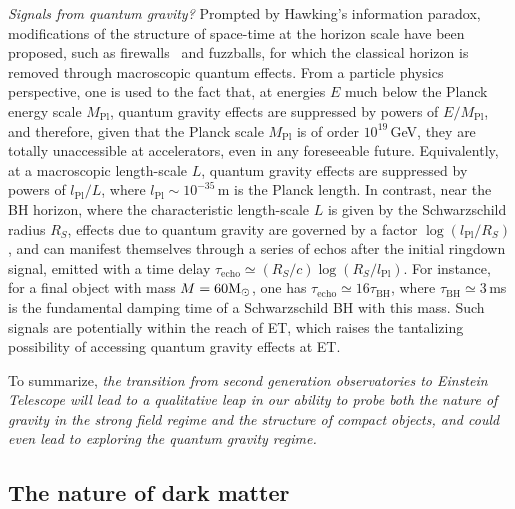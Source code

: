 \emph{Signals from quantum gravity?}
Prompted by Hawking's 
information paradox, modifications of the structure of space-time at the horizon scale have been proposed, such as firewalls~\cite{Almheiri:2012rt} and fuzzballs,
for which the classical horizon is removed through macroscopic quantum effects. 
From a particle physics perspective, one is used to the fact that, at energies $E$ much below the Planck energy scale $M_{\mathrm{Pl}}$, quantum gravity effects are suppressed by powers of 
$E/M_{\mathrm{Pl}}$, and therefore, given that  the Planck scale $M_{\mathrm{Pl}}$ is of order $10^{19}$\,GeV, they are totally unaccessible at accelerators, even in any foreseeable future. Equivalently, at a macroscopic length-scale $L$, quantum gravity effects are suppressed by powers of $l_{\mathrm{Pl}}/L$, where $l_{\mathrm{Pl}}\sim 10^{-35}$\,m is the Planck length. In contrast, near the BH horizon, where the characteristic length-scale $L$ is given by the Schwarzschild radius $R_S$, effects due to quantum gravity  are governed  by a factor  $\log (l_{\mathrm{Pl}}/R_S)$, and can manifest themselves  through a series of echos after the initial ringdown signal,
emitted with a time delay  $\tau_{\mathrm{echo}}\simeq (R_S/c) \log (R_S/l_{\mathrm{Pl}})$. For instance, for a final object with mass $M=60\mathrm{M}_{\odot}$, one has 
$\tau_{\mathrm{echo}}\simeq 16 \tau_{\mathrm{BH}}$, where $\tau_{\mathrm{BH}}\simeq 3$\,ms is the fundamental damping time of a Schwarzschild BH with this mass. Such signals 
 are potentially within the reach of ET, which raises the tantalizing possibility of accessing 
quantum gravity effects at ET.

To summarize, \emph{the transition from second generation observatories to Einstein Telescope
will lead to a qualitative leap in our ability to probe both the nature of gravity in the strong field regime 
and the structure of compact objects, and could even lead to exploring the quantum gravity regime.} 


\subsection{The nature of dark matter}

